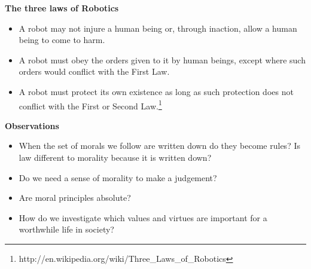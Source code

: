 \documentclass[11pt, oneside]{article}   	%
\begin{document}
\par \textbf{The three laws of Robotics}
\begin{itemize}
	\item A robot may not injure a human being or, through inaction, allow a human being to come to harm.
	\item A robot must obey the orders given to it by human beings, except where such orders would conflict with the First Law.
	\item A robot must protect its own existence as long as such protection does not conflict with the First or Second Law.\footnote{http://en.wikipedia.org/wiki/Three\_Laws\_of\_Robotics}
\end{itemize}

\par \textbf{Observations}
\begin{itemize}
	\item When the set of morals we follow are written down do they become rules? Is law different to morality because it is written down?
	\item Do we need a sense of morality to make a judgement?
	\item Are moral principles absolute?
	\item How do we investigate which values and virtues are important for a worthwhile life in society?
\end{itemize}
\end{document}
